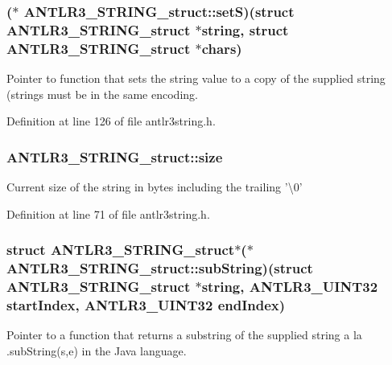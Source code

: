 \hypertarget{struct_a_n_t_l_r3___s_t_r_i_n_g__struct_a3911d5010e30a8f786a2dbd29887d585}{
\subsubsection[{set\-S}]{($\ast$ A\-N\-T\-L\-R3\-\_\-\-S\-T\-R\-I\-N\-G\-\_\-struct\-::set\-S)(struct {\bf A\-N\-T\-L\-R3\-\_\-\-S\-T\-R\-I\-N\-G\-\_\-struct} $\ast$string, struct {\bf A\-N\-T\-L\-R3\-\_\-\-S\-T\-R\-I\-N\-G\-\_\-struct} $\ast${\bf chars})}}\label{struct_a_n_t_l_r3___s_t_r_i_n_g__struct_a3911d5010e30a8f786a2dbd29887d585}
Pointer to function that sets the string value to a copy of the supplied string (strings must be in the same encoding. 

Definition at line 126 of file antlr3string.\-h.

\hypertarget{struct_a_n_t_l_r3___s_t_r_i_n_g__struct_a31c55004043befad2178e0560f6bc218}{
\subsubsection[{size}]{ A\-N\-T\-L\-R3\-\_\-\-S\-T\-R\-I\-N\-G\-\_\-struct\-::size}}\label{struct_a_n_t_l_r3___s_t_r_i_n_g__struct_a31c55004043befad2178e0560f6bc218}
Current size of the string in bytes including the trailing '\textbackslash{}0' 

Definition at line 71 of file antlr3string.\-h.

\hypertarget{struct_a_n_t_l_r3___s_t_r_i_n_g__struct_aa8f19ad943805160828b2fcc8f52725e}{
\subsubsection[{sub\-String}]{\setlength{\rightskip}{0pt plus 5cm}struct {\bf A\-N\-T\-L\-R3\-\_\-\-S\-T\-R\-I\-N\-G\-\_\-struct}$\ast$($\ast$ A\-N\-T\-L\-R3\-\_\-\-S\-T\-R\-I\-N\-G\-\_\-struct\-::sub\-String)(struct {\bf A\-N\-T\-L\-R3\-\_\-\-S\-T\-R\-I\-N\-G\-\_\-struct} $\ast$string, {\bf A\-N\-T\-L\-R3\-\_\-\-U\-I\-N\-T32} start\-Index, {\bf A\-N\-T\-L\-R3\-\_\-\-U\-I\-N\-T32} end\-Index)}}\label{struct_a_n_t_l_r3___s_t_r_i_n_g__struct_aa8f19ad943805160828b2fcc8f52725e}
Pointer to a function that returns a substring of the supplied string a la .sub\-String(s,e) in the Java language. 

